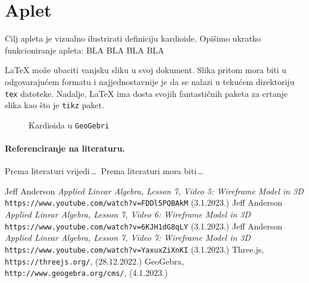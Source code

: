 \documentclass[a4paper,12pt]{article}
\begin{document}
\section{Aplet}
Cilj apleta je vizualno ilustrirati definiciju kardioide. Opišimo ukratko funkcioniranje apleta: BLA BLA BLA BLA

\LaTeX{} može ubaciti vanjsku sliku u svoj dokument. Slika pritom mora biti u odgovarajućem formatu i najjednostavnije je da se nalazi u tekućem
direktoriju \verb|tex| datoteke. Nadalje, \LaTeX{} ima dosta svojih fantastičnih paketa za crtanje slika kao što je \verb|tikz| paket.\par
\vspace*{5mm}
\begin{figure}[!h]
\centering

\caption{Kardioida u \texttt{GeoGebri}}
\end{figure}

\paragraph{Referenciranje na literaturu.} Prema literaturi \cite{Maric} vrijedi\,\ldots \ Prema literaturi \cite{geo} mora biti\,\ldots

\begin{thebibliography}{9}

 Jeff Anderson \emph{Applied Linear Algebra, Lesson 7, Video 5: Wireframe Model in 3D} \texttt{https://www.youtube.com/watch?v=FDDl5PQBAkM} (3.1.2023.)
 Jeff Anderson \emph{Applied Linear Algebra, Lesson 7, Video 6: Wireframe Model in 3D} \texttt{https://www.youtube.com/watch?v=6KJH1dG8qLY} (3.1.2023.)
 Jeff Anderson \emph{Applied Linear Algebra, Lesson 7, Video 7: Wireframe Model in 3D} \texttt{https://www.youtube.com/watch?v=YaxuxZiXnKI} (3.1.2023.)
 Three.js, \texttt{https://threejs.org/}, (28.12.2022.)
 GeoGebra, \texttt{http://www.geogebra.org/cms/}, (4.1.2023.)
\end{thebibliography}
\end{document}
